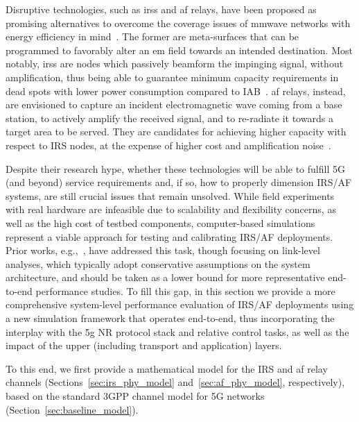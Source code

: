 Disruptive technologies, such as \glspl{irs} and \gls{af} relays, have been proposed as promising alternatives to overcome the coverage issues of \gls{mmwave} networks with energy efficiency in mind~\cite{flamini2022towards}. 
The former are meta-surfaces that can be programmed to favorably alter an \gls{em} field towards an intended destination. 
Most notably, \glspl{irs} are nodes which passively beamform the impinging signal, without amplification, thus being able to guarantee minimum capacity requirements in dead spots with lower power consumption compared to IAB~\cite{bjornson2019intelligent}. 
\Gls{af} relays, instead, are envisioned to capture an incident electromagnetic wave %
coming from a base station, to actively amplify the received signal, and to re-radiate it %
towards a target area to be served. They are candidates for achieving higher capacity with respect to IRS nodes, at the expense of higher cost and amplification noise~\cite{huang2019reconfigurable}.

Despite their research hype, whether these technologies will be able to fulfill 5G (and beyond) service requirements and, if so, how to properly dimension IRS/AF systems, are still crucial issues that remain unsolved. 
While field experiments with real hardware are infeasible due to scalability and flexibility concerns, as well as the high cost of testbed components, computer-based simulations represent a viable approach for testing and calibrating IRS/AF deployments. %
Prior works, e.g.,~\cite{wu2018intelligent,9282349}, have addressed this task, though focusing on link-level analyses, which typically adopt conservative assumptions on the system architecture, and should be taken as a lower bound for more representative end-to-end performance studies.
To fill this gap, in this section we provide a more comprehensive system-level performance evaluation of IRS/AF deployments using a new simulation
framework that operates end-to-end, thus incorporating the interplay with the \gls{5g} NR protocol stack and relative control tasks, as well as the impact of the upper (including transport and application) layers.

To this end, we first provide a mathematical model for the IRS and \gls{af} relay channels (Sections~\ref{sec:irs_phy_model} and~\ref{sec:af_phy_model}, respectively), based on the standard 3GPP channel model for 5G networks (Section~\ref{sec:baseline_model}).

